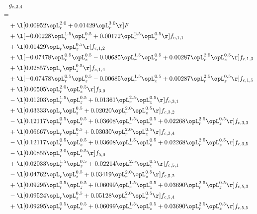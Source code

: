 \begin{alignat}{2} 
\label{eq:g_24_0} 
& g_{c,2,4} \nonumber \\ 
 = \\ 
& + \l[  0.00952 \opL_r^{2.0} +  0.01429 \opL_r^{3.0}  \r] F \nonumber \\ 
& + \l[  -0.00228 \opL_r^{1.5} \opL_z^{0.5} +  0.00172 \opL_r^{2.5} \opL_z^{0.5}  \r] f_{c,1,1} \nonumber \\ 
& + \l[  0.01429 \opL_r \opL_z^{0.5}  \r] f_{c,1,2} \nonumber \\ 
& + \l[  -0.07478 \opL_r^{0.5} \opL_z^{0.5}   -0.00685 \opL_r^{1.5} \opL_z^{0.5} +  0.00287 \opL_r^{2.5} \opL_z^{0.5}  \r] f_{c,1,3} \nonumber \\ 
& + \l[  0.02857 \opL_r \opL_z^{0.5}  \r] f_{c,1,4} \nonumber \\ 
& + \l[  -0.07478 \opL_r^{0.5} \opL_z^{0.5}   -0.00685 \opL_r^{1.5} \opL_z^{0.5} +  0.00287 \opL_r^{2.5} \opL_z^{0.5}  \r] f_{c,1,5} \nonumber \\ 
& + \l[  0.00505 \opL_r^{2.0} \opL_z^{0.5}  \r] f_{3,0} \nonumber \\ 
& - \l[  0.01203 \opL_r^{1.5} \opL_z^{0.5} +  0.01361 \opL_r^{2.5} \opL_z^{0.5}  \r] f_{c,3,1} \nonumber \\ 
& + \l[  0.03333 \opL_r \opL_z^{0.5} +  0.02020 \opL_r^{2.0} \opL_z^{0.5}  \r] f_{c,3,2} \nonumber \\ 
& - \l[  0.12117 \opL_r^{0.5} \opL_z^{0.5} +  0.03608 \opL_r^{1.5} \opL_z^{0.5} +  0.02268 \opL_r^{2.5} \opL_z^{0.5}  \r] f_{c,3,3} \nonumber \\ 
& + \l[  0.06667 \opL_r \opL_z^{0.5} +  0.03030 \opL_r^{2.0} \opL_z^{0.5}  \r] f_{c,3,4} \nonumber \\ 
& - \l[  0.12117 \opL_r^{0.5} \opL_z^{0.5} +  0.03608 \opL_r^{1.5} \opL_z^{0.5} +  0.02268 \opL_r^{2.5} \opL_z^{0.5}  \r] f_{c,3,5} \nonumber \\ 
& - \l[  0.00855 \opL_r^{2.0} \opL_z^{0.5}  \r] f_{5,0} \nonumber \\ 
& + \l[  0.02033 \opL_r^{1.5} \opL_z^{0.5} +  0.02214 \opL_r^{2.5} \opL_z^{0.5}  \r] f_{c,5,1} \nonumber \\ 
& - \l[  0.04762 \opL_r \opL_z^{0.5} +  0.03419 \opL_r^{2.0} \opL_z^{0.5}  \r] f_{c,5,2} \nonumber \\ 
& + \l[  0.09295 \opL_r^{0.5} \opL_z^{0.5} +  0.06099 \opL_r^{1.5} \opL_z^{0.5} +  0.03690 \opL_r^{2.5} \opL_z^{0.5}  \r] f_{c,5,3} \nonumber \\ 
& - \l[  0.09524 \opL_r \opL_z^{0.5} +  0.05128 \opL_r^{2.0} \opL_z^{0.5}  \r] f_{c,5,4} \nonumber \\ 
& + \l[  0.09295 \opL_r^{0.5} \opL_z^{0.5} +  0.06099 \opL_r^{1.5} \opL_z^{0.5} +  0.03690 \opL_r^{2.5} \opL_z^{0.5}  \r] f_{c,5,5} \nonumber \\ 
\end{alignat} 



